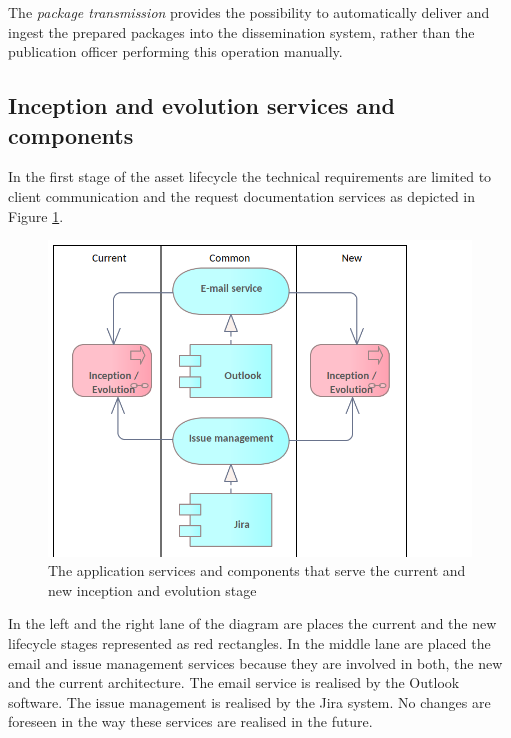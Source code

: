 	The \textit{package transmission} provides the possibility to automatically deliver and ingest the prepared packages into the dissemination system, rather than the publication officer performing this operation manually. 
	

	
	\subsection{Inception and evolution services and components}
	\label{sec:evolution-application}
	
	In the first stage of the asset lifecycle the technical requirements are limited to client communication and the request documentation services as depicted in Figure \ref{fig:application-inception-evolution}.
	
	\begin{figure}[h]
		\centering
		\includegraphics[width=.6\textwidth]{images/application/InceptionEvolution.png}
		\caption{The application services and components that serve the current and new inception and evolution stage}
		\label{fig:application-inception-evolution}
	\end{figure}
	
	In the left and the right lane of the diagram are places the current and the new lifecycle stages represented as red rectangles. In the middle lane are placed the email and issue management services because they are involved in both, the new and the current architecture. 
	The email service is realised by the Outlook software. The issue management is realised by the Jira system. No changes are foreseen in the way these services are realised in the future. 

